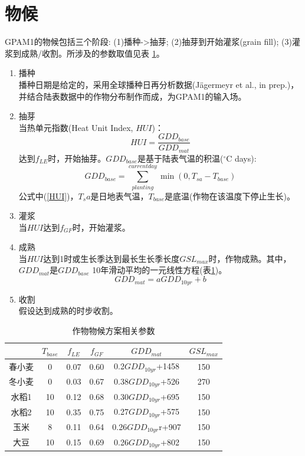 \section{物候}
GPAM1的物候包括三个阶段: (1)播种->抽芽; (2)抽芽到开始灌浆(grain fill); (3)灌浆到成熟/收割。所涉及的参数取值见表 \ref{tab:作物物候方案相关参数}。\\
\begin{enumerate}
  \item 播种\\
  播种日期是给定的，采用全球播种日再分析数据(Jägermeyr et al., in prep.)，并结合陆表数据中的作物分布制作而成，为GPAM1的输入场。
  \item 抽芽\\
  当热单元指数(Heat Unit Index, $HUI$)：
  \begin{equation}\label{HUI}
  HUI=\frac{GDD_{base}}{GDD_{mat}}
  \end{equation}
  达到$f_{LE}$时，开始抽芽。$GDD_{base}$是基于陆表气温的积温($^{\circ}$C days):
  \begin{equation}
  GDD_{ {base }}=\sum_{planting}^{currentday} \min \left(0, T_{sa}-T_{base}\right)
  \end{equation}
  公式中(\ref{HUI})，$T_sa$是日地表气温，$T_{base}$是底温(作物在该温度下停止生长)。\\
  \item 灌浆\\
  当$HUI$达到$f_{GF}$时，开始灌浆。
  \item 成熟\\
  当$HUI$达到1时或生长季达到最长生长季长度$GSL_{max}$时，作物成熟。其中，$GDD_{mat}$是$GDD_{base}$ 
  10年滑动平均的一元线性方程(表\ref{tab:作物物候方案相关参数})。
  \begin{equation}
    GDD_{mat}=a GDD_{10yr}+b
  \end{equation}
  \item 收割\\
  假设达到成熟的时步收割。
\end{enumerate}
\begin{table}[]
  \centering
  \caption{作物物候方案相关参数}
  \label{tab:作物物候方案相关参数}
\begin{tabular}{@{}cccccc@{}}
\toprule
    & $T_{base}$ & $f_{LE}$  & $f_{GF}$  & $GDD_{mat}$          & $GSL_{max}$ \\ \midrule
春小麦 & 0     & 0.07 & 0.60 & 0.2$GDD_{10yr}$+1458 & 150    \\
冬小麦 & 0     & 0.03 & 0.67 & 0.38$GDD_{10yr}$+526 & 270    \\
水稻1 & 10    & 0.12 & 0.68 & 0.30$GDD_{10yr}$+695 & 150    \\
水稻2 & 10    & 0.35 & 0.75 & 0.27$GDD_{10yr}$+575 & 150    \\
玉米  & 8     & 0.11 & 0.64 & 0.26$GDD_{10yr}$r+907 & 150    \\
大豆  & 10    & 0.15 & 0.69 & 0.26$GDD_{10yr}$+802 & 150    \\ \bottomrule
\end{tabular}
\end{table}

